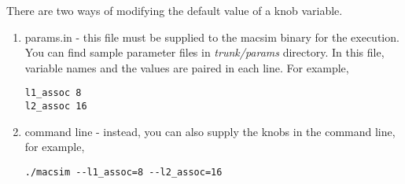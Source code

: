 There are two ways of modifying the default value of a knob variable.

\begin{enumerate}
  \item params.in - this file must be supplied to the macsim binary
  for the execution. You can find sample parameter files
  in \textit{trunk/params} directory. In this file, variable names and
  the values are paired in each line. For example,

\smallskip
\begin{lstlisting}
l1_assoc 8
l2_assoc 16
\end{lstlisting}
\smallskip


  \item command line - instead, you can also supply the knobs in the command line, for example,

\smallskip
\begin{lstlisting}
./macsim --l1_assoc=8 --l2_assoc=16
\end{lstlisting}
\smallskip

\end{enumerate}



